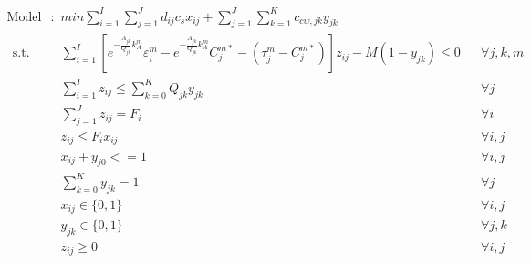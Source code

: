 \documentclass[preprint,12pt,authoryear]{elsarticle}
\begin{document}
\newpage
\begin{equation*}\label{modelD}
\begin{aligned}
	\text{Model D}:~~&min \sum_{i=1}^{I}\sum_{j=1}^{J}d_{ij}c_s x_{ij} + \sum_{j=1}^{J}\sum_{k=1}^{K}c_{cw,jk}y_{jk}\\~~
	\mbox{s.t.}~~
	&\sum_{i=1}^{I} [ e^{-\frac{A_{jk}}{Q_{jk}}k_{A}^{m}} \varepsilon_i^m - e^{-\frac{A_{jk}}{Q_{jk}}k_{A}^{m}} C_j^{m*} - (\tau_j^m - C_j^{m*})] z_{ij} - M(1 - y_{jk}) \leq 0 && \forall j,k,m\\
 	&\sum_{i=1}^{I} z_{ij} \leq \sum_{k=0}^K Q_{jk} y_{jk} && \forall j\\
	&\sum_{j=1}^J z_{ij} = F_i && \forall i\\
	&z_{ij} \leq F_i x_{ij} && \forall i,j\\
	&x_{ij} + y_{j0} <= 1 && \forall i,j\\
	&\sum_{k=0}^{K}y_{jk} = 1&&\forall j\\
	&x_{ij} \in \{0,1\}&&\forall i,j\\
	&y_{jk} \in \{0,1\}&&\forall j,k\\
	&z_{ij} \geq 0&&\forall i,j\\
\end{aligned}
\end{equation*}
\newpage
\end{document}

